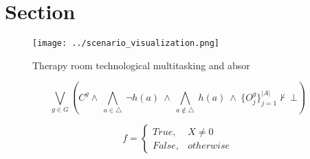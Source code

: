 \documentclass[a4paper]{article}
\begin{document}
\section{Section}

\begin{figure}
\centering
\texttt{[image: ../scenario\_visualization.png]}
\caption{Therapy room technological multitasking and absor
}
\end{figure}
 
\[\bigvee_{g\in G} (C^g \wedge\ \bigwedge_{a\in \triangle}\ \neg h(a)\ \wedge\ \bigwedge_{a\notin \triangle}\ h(a)\ \wedge\ \{O_j^g\}_{j=1}^{|A|} \nvdash\ \bot )\]

\begin{equation}   f =
\begin{cases} True, & X \neq 0\\
False, & otherwise
\end{cases}
\end{equation}
\end{document}
